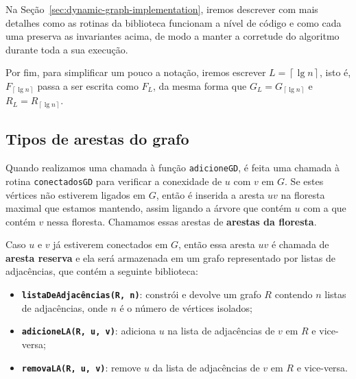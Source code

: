 Na Seção~\ref{sec:dynamic-graph-implementation}, iremos descrever com mais detalhes como as rotinas da biblioteca funcionam a nível de código e como cada uma preserva as invariantes acima, de modo a manter a corretude do algoritmo durante toda a sua execução.

Por fim, para simplificar um pouco a notação, iremos escrever $L = \left\lceil \lg n \right\rceil$, isto é, $F_{\left\lceil \lg n \right\rceil}$ passa a ser escrita como $F_{L}$, da mesma forma que $G_L = G_{\left\lceil \lg n \right\rceil}$ e $R_L = R_{\left\lceil \lg n \right\rceil}$.

\subsection{Tipos de arestas do grafo}
\label{sec:dynamic-graph-edge-types}


Quando realizamos uma chamada à função \texttt{adicioneGD}, é feita uma chamada à rotina \texttt{conectadosGD} para verificar a conexidade de $u$ com $v$ em $G$. Se estes vértices não estiverem ligados em $G$, então é inserida a aresta $uv$ na floresta maximal que estamos mantendo, assim ligando a árvore que contém $u$ com a que contém $v$ nessa floresta. Chamamos essas arestas de \textbf{arestas da floresta}.

Caso $u$ e $v$ já estiverem conectados em $G$, então essa aresta $uv$ é chamada de \textbf{aresta reserva} e ela será armazenada em um grafo representado por listas de adjacências, que contém a seguinte biblioteca:

\begin{itemize}
    \item \texttt{\textbf{listaDeAdjacências(R, n)}}: constrói e devolve um grafo $R$ contendo $n$ listas de adjacências, onde $n$ é o número de vértices isolados;
    \item \texttt{\textbf{adicioneLA(R, u, v)}}: adiciona $u$ na lista de adjacências de $v$ em $R$ e vice-versa;
    \item \texttt{\textbf{removaLA(R, u, v)}}: remove $u$ da lista de adjacências de $v$ em $R$ e vice-versa.
\end{itemize} 

